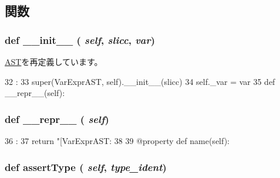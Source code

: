 \subsection{関数}
\hypertarget{classslicc_1_1ast_1_1VarExprAST_1_1VarExprAST_ac775ee34451fdfa742b318538164070e}{
\subsubsection[{\_\-\_\-init\_\-\_\-}]{\setlength{\rightskip}{0pt plus 5cm}def \_\-\_\-init\_\-\_\- ( {\em self}, \/   {\em slicc}, \/   {\em var})}}
\label{classslicc_1_1ast_1_1VarExprAST_1_1VarExprAST_ac775ee34451fdfa742b318538164070e}


\hyperlink{classslicc_1_1ast_1_1AST_1_1AST_ac775ee34451fdfa742b318538164070e}{AST}を再定義しています。


\begin{DoxyCode}
32                                   :
33         super(VarExprAST, self).__init__(slicc)
34         self._var = var
35 
    def __repr__(self):
\end{DoxyCode}
\hypertarget{classslicc_1_1ast_1_1VarExprAST_1_1VarExprAST_ad8b9328939df072e4740cd9a63189744}{
\subsubsection[{\_\-\_\-repr\_\-\_\-}]{\setlength{\rightskip}{0pt plus 5cm}def \_\-\_\-repr\_\-\_\- ( {\em self})}}
\label{classslicc_1_1ast_1_1VarExprAST_1_1VarExprAST_ad8b9328939df072e4740cd9a63189744}



\begin{DoxyCode}
36                       :
37         return "[VarExprAST: %
38 
39     @property
    def name(self):
\end{DoxyCode}
\hypertarget{classslicc_1_1ast_1_1VarExprAST_1_1VarExprAST_aad7979207dee5627335e037dd5db9840}{
\subsubsection[{assertType}]{\setlength{\rightskip}{0pt plus 5cm}def assertType ( {\em self}, \/   {\em type\_\-ident})}}
\label{classslicc_1_1ast_1_1VarExprAST_1_1VarExprAST_aad7979207dee5627335e037dd5db9840}



